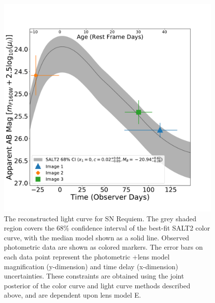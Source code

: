 \documentclass[12pt,dvipsnames]{article}
\def\SNABC{SN Requiem\xspace}
\begin{document}
\begin{figure}[h!]
    \centering
    \includegraphics[width=\textwidth]{Paper/Figures/full_lightcurve.pdf}
    \caption{\label{fig:full_lightcurve}The reconstructed light curve for \SNABC. The grey shaded region covers the 68\% confidence interval of the best-fit SALT2 color curve, with the median model shown as a solid line. Observed photometric data are shown as colored markers.   The error bars on each data point represent the photometric +lens model magnification (y-dimension) and time delay (x-dimension) uncertainties. These constraints are obtained using the joint posterior of the color curve and light curve methods described above, and are dependent upon lens model E.}
\end{figure}
\end{document}
